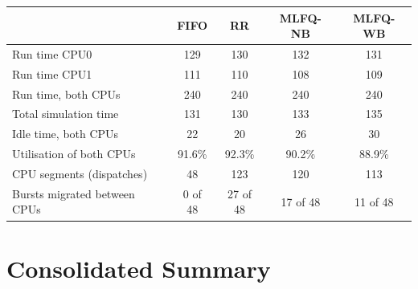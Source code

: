 \documentclass[11pt,a4paper]{article}
\begin{document}
\begin{center}\footnotesize\begin{tabular}{lcccc}\toprule
& \textbf{FIFO} & \textbf{RR} & \textbf{MLFQ-NB} & \textbf{MLFQ-WB}\\\midrule
Run time CPU0 & 129 & 130 & 132 & 131 \\
Run time CPU1 & 111 & 110 & 108 & 109 \\
Run time, both CPUs & 240 & 240 & 240 & 240 \\
Total simulation time & 131 & 130 & 133 & 135 \\
Idle time, both CPUs & 22 & 20 & 26 & 30 \\
Utilisation of both CPUs & 91.6\% & 92.3\% & 90.2\% & 88.9\% \\
CPU segments (dispatches) & 48 & 123 & 120 & 113 \\
Bursts migrated between CPUs & 0 of 48 & 27 of 48 & 17 of 48 & 11 of 48 \\
\bottomrule\end{tabular}\end{center}

\newpage
\section{Consolidated Summary}
\end{document}
